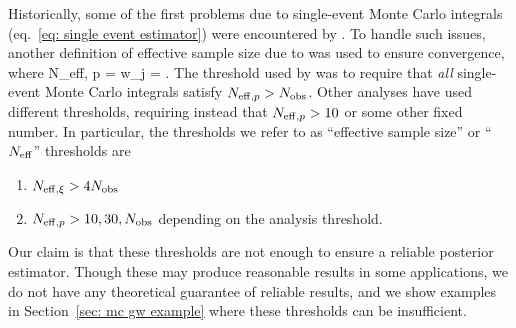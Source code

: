 Historically, some of the first problems due to single-event Monte Carlo integrals (eq.~\ref{eq: single event estimator}) were encountered by \citet{KAGRA:2021duu}. To handle such issues, another definition of effective sample size due to \citet{kish1965survey} was used to ensure convergence, where
\beq
N_{{\rm eff}, p} \equiv {} =  \qquad\qquad {} \qquad \qquad w_j = .
\eeq
The threshold used by \citet{KAGRA:2021duu} was to require that \textit{all} single-event Monte Carlo integrals satisfy $N_{{\rm eff}, p} > N_{\rm obs}$. Other analyses have used different thresholds, requiring instead that $N_{{\rm eff}, p} > 10$ or some other fixed number. 
In particular, the thresholds we refer to as ``effective sample size'' or ``$N_{\rm eff}$'' thresholds are
\begin{enumerate}
    \item $N_{{\rm eff},\xi} > 4N_{\rm obs}$
    \item $N_{{\rm eff},p} > 10, 30, N_{\rm obs}$ depending on the analysis threshold.
\end{enumerate}
Our claim is that these thresholds are not enough to ensure a reliable posterior estimator. Though these may produce reasonable results in some applications, we do not have any theoretical guarantee of reliable results, and we show examples in Section~\ref{sec: mc gw example} where these thresholds can be insufficient.

